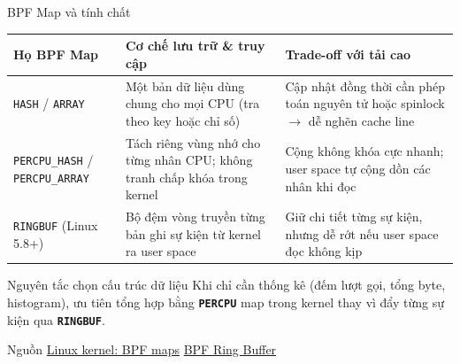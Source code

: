 \begin{frame}{BPF Map và tính chất}
  \small
  \renewcommand{\arraystretch}{1.34}
  \begin{tabular}{@{}L{0.23\textwidth}L{0.34\textwidth}L{0.35\textwidth}@{}}
    \toprule
    \textbf{Họ BPF Map}                            & \textbf{Cơ chế lưu trữ \& truy cập}                                       & \textbf{Trade-off với tải cao}                                                             \\
    \midrule
    \texttt{HASH} / \texttt{ARRAY}                 & Một bản dữ liệu dùng chung cho mọi CPU (tra theo key hoặc chỉ số)         & Cập nhật đồng thời cần phép toán nguyên tử hoặc spinlock $\rightarrow$ dễ nghẽn cache line \\
    \texttt{PERCPU\_HASH} / \texttt{PERCPU\_ARRAY} & Tách riêng vùng nhớ cho từng nhân CPU; không tranh chấp khóa trong kernel & Cộng không khóa cực nhanh; user space tự cộng dồn các nhân khi đọc                         \\
    \texttt{RINGBUF} (Linux 5.8+)                  & Bộ đệm vòng truyền từng bản ghi sự kiện từ kernel ra user space           & Giữ chi tiết từng sự kiện, nhưng dễ rớt nếu user space đọc không kịp                       \\
    \bottomrule
  \end{tabular}
  \medskip

  \begin{block}{Nguyên tắc chọn cấu trúc dữ liệu}
    Khi chỉ cần thống kê (đếm lượt gọi, tổng byte, histogram), ưu tiên tổng hợp bằng \textbf{\texttt{PERCPU}} map trong kernel thay vì đẩy từng sự kiện qua \textbf{\texttt{RINGBUF}}.
  \end{block}
  {\scriptsize Nguồn \href{https://docs.kernel.org/bpf/maps.html}{Linux kernel: BPF maps} \quad \textbar \quad \href{https://docs.kernel.org/bpf/ringbuf.html}{BPF Ring Buffer}}
\end{frame}
